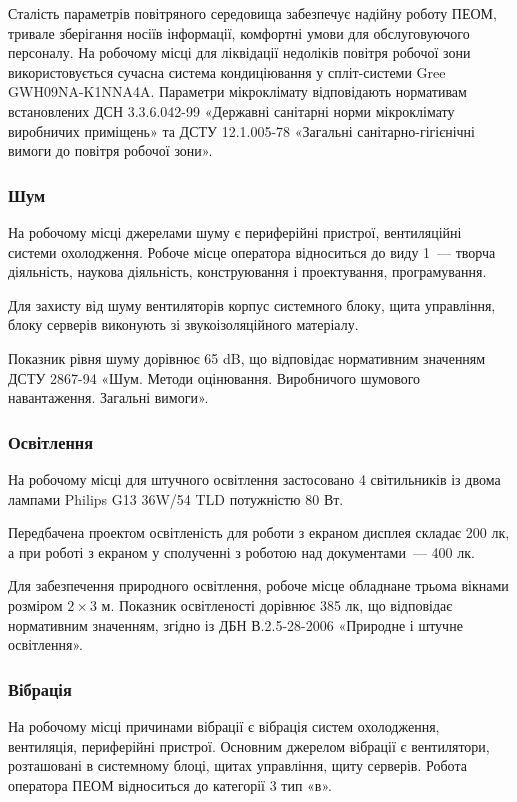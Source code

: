 \documentclass[a4paper,ukrainian,utf8,nocolumnsxix,floatsection,equationsection]{eskdtext}
\renewcommand\paragraph{\subsubsection}
\begin{document}
Сталість параметрів повітряного середовища забезпечує надійну роботу ПЕОМ, тривале зберігання носіїв інформації, комфортні умови для обслуговуючого персоналу. На робочому місці для ліквідації недоліків повітря робочої зони використовується сучасна система кондиціювання у спліт-системи Gree GWH09NA-K1NNA4A. Параметри мікроклімату відповідають нормативам встановлених ДСН 3.3.6.042-99 «Державні санітарні норми мікроклімату виробничих приміщень» та ДСТУ 12.1.005-78 «Загальні санітарно-гігієнічні вимоги до повітря робочої зони».

\paragraph{Шум}

На робочому місці джерелами шуму є периферійні пристрої, вентиляційні системи охолодження. Робоче місце оператора відноситься до виду 1~--- творча діяльність, наукова діяльність, конструювання і проектування, програмування.

Для захисту від шуму вентиляторів корпус системного блоку, щита управління, блоку серверів виконують зі звукоізоляційного матеріалу. 

Показник рівня шуму дорівнює 65 dB, що відповідає нормативним значенням ДСТУ 2867-94 «Шум. Методи оцінювання. Виробничого шумового навантаження. Загальні вимоги».

\paragraph{Освітлення}

На робочому місці для штучного освітлення застосовано 4 світильників із двома лампами Philips G13 36W/54 TLD потужністю 80 Вт. 

Передбачена проектом освітленість для роботи з екраном дисплея складає 200 лк, а при роботі з екраном у сполученні з роботою над документами~--- 400 лк.

Для забезпечення природного освітлення, робоче місце обладнане трьома вікнами розміром $2\times3$ м. Показник освітленості дорівнює 385 лк, що відповідає нормативним значенням, згідно із ДБН В.2.5-28-2006 «Природне і штучне освітлення».

\paragraph{Вібрація}

На робочому місці причинами вібрації є вібрація систем охолодження, вентиляція, периферійні пристрої. Основним джерелом вібрації є вентилятори, розташовані в системному блоці, щитах управління, щиту серверів. Робота оператора ПЕОМ відноситься до категорії 3 тип «в».
\end{document}
